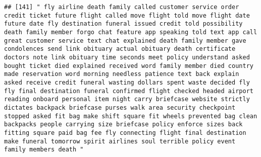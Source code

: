 \documentclass[
]{article}
\begin{document}
\begin{verbatim}
## [141] " fly airline death family called customer service order credit ticket future flight called move flight told move flight date future date fly destination funeral issued credit told possibility death family member forgo chat feature app speaking told text app call great customer service text chat explained death family member gave condolences send link obituary actual obituary death certificate doctors note link obituary time seconds meet policy understand asked bought ticket died explained received word family member died country made reservation word morning needless patience text back explain asked receive credit funeral wasting dollars spent waste decided fly fly final destination funeral confirmed flight checked headed airport reading onboard personal item night carry briefcase website strictly dictates backpack briefcase purses walk area security checkpoint stopped asked fit bag make shift square fit wheels prevented bag clean backpacks people carrying size briefcase policy enforce sizes back fitting square paid bag fee fly connecting flight final destination make funeral tomorrow spirit airlines soul terrible policy event family members death "                                                                                                                                                                                                                                                                                                                                                                                                                                                                                                                                                                                

\end{verbatim}
\end{document}
